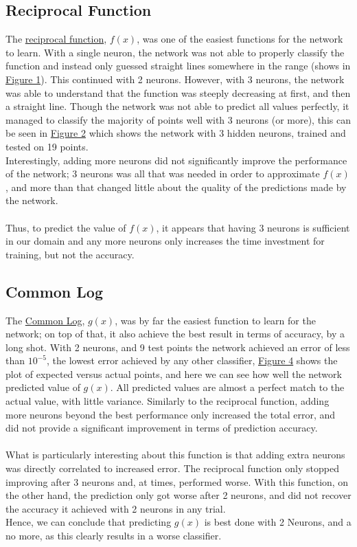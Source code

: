 \documentclass{article}
\begin{document}
	\subsection{Reciprocal Function}\label{S41}
		The \hyperref[EQ]{reciprocal function}, $f(x)$, was one of the easiest functions for the network to learn. With a single neuron, the network was not able to properly classify the function and instead only guessed straight lines somewhere in the range (shows in \hyperref[F_I_1]{Figure 1}). This continued with 2 neurons. However, with 3 neurons, the network was able to understand that the function was steeply decreasing at first, and then a straight line. Though the network was not able to predict all values perfectly, it managed to classify the majority of points well with 3 neurons (or more), this can be seen in \hyperref[F_I_2]{Figure 2} which shows the network with 3 hidden neurons, trained and tested on 19 points.\\ Interestingly, adding more neurons did not significantly improve the performance of the network; 3 neurons was all that was needed in order to approximate $f(x)$, and more than that changed little about the quality of the predictions made by the network.\\ 
		\\ Thus, to predict the value of $f(x)$, it appears that having 3 neurons is sufficient in our domain and any more neurons only increases the time investment for training, but not the accuracy. 
	
	\subsection{Common Log}\label{S42}
		The \hyperref[EQ]{Common Log}, $g(x)$, was by far the easiest function to learn for the network; on top of that, it also achieve the best result in terms of accuracy, by a long shot. With 2 neurons, and 9 test points the network achieved an error of less than $10^{-5}$, the lowest error achieved by any other classifier, \hyperref[F_L_2]{Figure 4} shows the plot of expected versus actual points, and here we can see how well the network predicted value of $g(x)$. All predicted values are almost a perfect match to the actual value, with little variance. Similarly to the reciprocal function, adding more neurons beyond the best performance only increased the total error, and did not provide a significant improvement in terms of prediction accuracy.\\
		\\ What is particularly interesting about this function is that adding extra neurons was directly correlated to increased error. The reciprocal function only stopped improving after 3 neurons and, at times, performed worse. With this function, on the other hand, the prediction only got worse after 2 neurons, and did not recover the accuracy it achieved with 2 neurons in any trial.\\ Hence, we can conclude that predicting $g(x)$ is best done with 2 Neurons, and a no more, as this clearly results in a worse classifier. 
	
\end{document}
